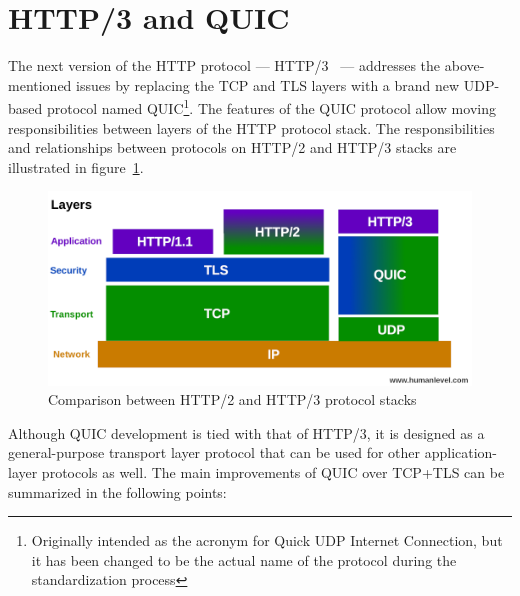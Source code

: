 \section{HTTP/3 and QUIC}

The next version of the HTTP protocol --- HTTP/3~\cite{draft-ietf-quic-http-29} --- addresses the
above-mentioned issues by replacing the TCP and TLS layers with a brand new UDP-based protocol named
QUIC\footnote{Originally intended as the acronym for Quick UDP Internet Connection, but it has been
changed to be the actual name of the protocol during the standardization process}. The features of
the QUIC protocol allow moving responsibilities between layers of the HTTP protocol stack. The
responsibilities and relationships between protocols on HTTP/2 and HTTP/3 stacks are illustrated in
figure~\ref{fig:http2-vs-http3-stack}.

\begin{figure}[h]
  \centering
  \includegraphics[width=\textwidth]{img/01-pile-http-protocol}
  \caption{Comparison between HTTP/2 and HTTP/3 protocol stacks}\label{fig:http2-vs-http3-stack}
\end{figure}


Although QUIC development is tied with that of HTTP/3, it is designed as a general-purpose transport
layer protocol that can be used for other application-layer protocols as well. The main improvements
of QUIC over TCP+TLS can be summarized in the following points:


